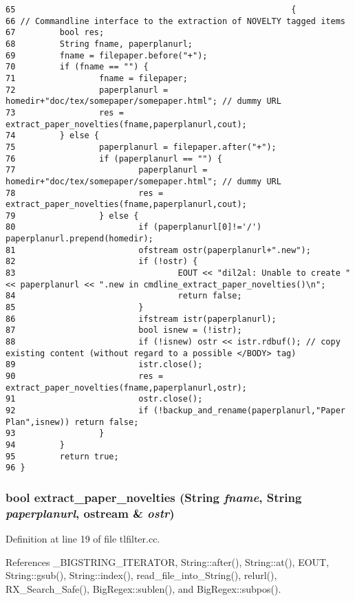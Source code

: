 \footnotesize\begin{verbatim}65                                                        {
66 // Commandline interface to the extraction of NOVELTY tagged items
67         bool res;
68         String fname, paperplanurl;
69         fname = filepaper.before("+");
70         if (fname == "") {
71                 fname = filepaper;
72                 paperplanurl = homedir+"doc/tex/somepaper/somepaper.html"; // dummy URL
73                 res = extract_paper_novelties(fname,paperplanurl,cout);
74         } else {
75                 paperplanurl = filepaper.after("+");
76                 if (paperplanurl == "") {
77                         paperplanurl = homedir+"doc/tex/somepaper/somepaper.html"; // dummy URL
78                         res = extract_paper_novelties(fname,paperplanurl,cout);
79                 } else {
80                         if (paperplanurl[0]!='/') paperplanurl.prepend(homedir);
81                         ofstream ostr(paperplanurl+".new");
82                         if (!ostr) {
83                                 EOUT << "dil2al: Unable to create " << paperplanurl << ".new in cmdline_extract_paper_novelties()\n";
84                                 return false;
85                         }
86                         ifstream istr(paperplanurl);
87                         bool isnew = (!istr);
88                         if (!isnew) ostr << istr.rdbuf(); // copy existing content (without regard to a possible </BODY> tag)
89                         istr.close();
90                         res = extract_paper_novelties(fname,paperplanurl,ostr);
91                         ostr.close();
92                         if (!backup_and_rename(paperplanurl,"Paper Plan",isnew)) return false;
93                 }
94         }
95         return true;
96 }
\end{verbatim}\normalsize 
{}
\subsubsection{\setlength{\rightskip}{0pt plus 5cm}bool extract\_\-paper\_\-novelties ({\bf String} {\em fname}, {\bf String} {\em paperplanurl}, ostream \& {\em ostr})}\label{tlfilter_8cc_a3}




Definition at line 19 of file tlfilter.cc.

References \_\-BIGSTRING\_\-ITERATOR, String::after(), String::at(), EOUT, String::gsub(), String::index(), read\_\-file\_\-into\_\-String(), relurl(), RX\_\-Search\_\-Safe(), Big\-Regex::sublen(), and Big\-Regex::subpos().

